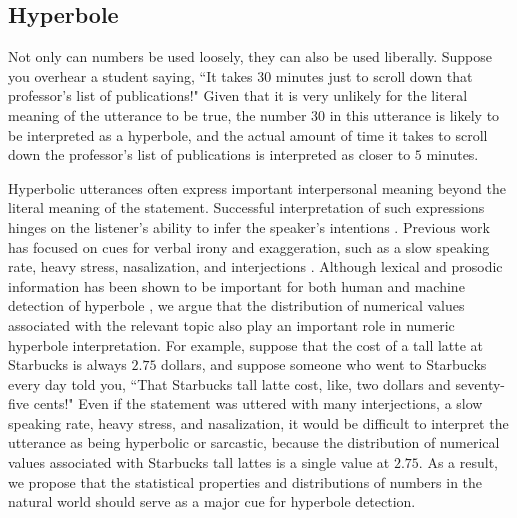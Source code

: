 \documentclass{article} %
\begin{document}
\subsection{Hyperbole}

Not only can numbers be used loosely, they can also be used liberally. Suppose you overhear a student saying, ``It takes 30 minutes just to scroll down that professor's list of publications!" Given that it is very unlikely for the literal meaning of the utterance to be true, the number $30$ in this utterance is likely to be interpreted as a hyperbole, and the actual amount of time it takes to scroll down the professor's list of publications is interpreted as closer to $5$ minutes.

Hyperbolic utterances often express important interpersonal meaning beyond the literal meaning of the statement. Successful interpretation of such expressions hinges on the listener's ability to infer the speaker's intentions \cite{mccarthy2004there, gibbs2000irony, cano2003risk}. Previous work has focused on cues for verbal irony and exaggeration, such as a slow speaking rate, heavy stress, nasalization, and interjections \cite{kreuz1995two, kreuz2007lexical}. Although lexical and prosodic information has been shown to be important for both human and machine detection of hyperbole \cite{davidov2010semi, reyes2011mining, van2007algorithm}, we argue that the distribution of numerical values associated with the relevant topic also play an important role in numeric hyperbole interpretation. For example, suppose that the cost of a tall latte at Starbucks is always $2.75$ dollars, and suppose someone who went to Starbucks every day told you, ``That Starbucks tall latte cost, like, two dollars and seventy-five cents!" Even if the statement was uttered with many interjections, a slow speaking rate, heavy stress, and nasalization, it would be difficult to interpret the utterance as being hyperbolic or sarcastic, because the distribution of numerical values associated with Starbucks tall lattes is a single value at $2.75$. As a result, we propose that the statistical properties and distributions of numbers in the natural world should serve as a major cue for hyperbole detection.
\end{document}
